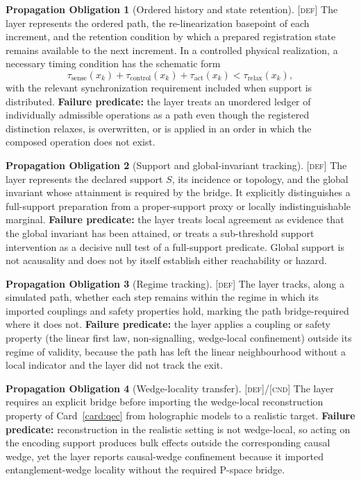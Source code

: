 \documentclass[11pt]{article}
\newcommand{\Defn}{\textsc{[def]}}
\newcommand{\Cnd}{\textsc{[cnd]}}
\theoremstyle{definition}
\newtheorem{sobligation}{Propagation Obligation}
\begin{document}
\begin{sobligation}[Ordered history and state retention]\label{ob:history}
\Defn{} The layer represents the ordered path, the re-linearization basepoint of
each increment, and the retention condition by which a prepared registration state
remains available to the next increment. In a controlled physical realization, a
necessary timing condition has the schematic form
\begin{equation}
\tau_{\mathrm{sense}}(x_k)+\tau_{\mathrm{control}}(x_k)+
\tau_{\mathrm{act}}(x_k)<\tau_{\mathrm{relax}}(x_k),
\label{eq:retention-cadence}
\end{equation}
with the relevant synchronization requirement included when support is distributed.
\textbf{Failure predicate:} the layer treats an unordered ledger of individually
admissible operations as a path even though the registered distinction relaxes,
is overwritten, or is applied in an order in which the composed operation does not
exist.
\end{sobligation}

\begin{sobligation}[Support and global-invariant tracking]\label{ob:support}
\Defn{} The layer represents the declared support $S$, its incidence or topology,
and the global invariant whose attainment is required by the bridge. It
explicitly distinguishes a full-support preparation from a proper-support proxy or
locally indistinguishable marginal. \textbf{Failure predicate:} the layer treats
local agreement as evidence that the global invariant has been attained, or treats
a sub-threshold support intervention as a decisive null test of a full-support
predicate. Global support is not acausality and does not by itself establish either
reachability or hazard.
\end{sobligation}

\begin{sobligation}[Regime tracking]\label{ob:regime}
\Defn{} The layer tracks, along a simulated path, whether each step remains within
the regime in which its imported couplings and safety properties hold, marking the
path bridge-required where it does not. \textbf{Failure predicate:} the layer
applies a coupling or safety property (the linear first law, non-signalling,
wedge-local confinement) outside its regime of validity, because the path has left
the linear neighbourhood without a local indicator and the layer did not track the
exit.
\end{sobligation}

\begin{sobligation}[Wedge-locality transfer]\label{ob:wedge}
\Defn{}/\Cnd{} The layer requires an explicit bridge before importing the
wedge-local reconstruction property of Card~\ref{card:qec} from holographic models
to a realistic target. \textbf{Failure predicate:} reconstruction in the realistic
setting is not wedge-local, so acting on the encoding support produces bulk effects
outside the corresponding causal wedge, yet the layer reports causal-wedge
confinement because it imported entanglement-wedge locality without the required
P-space bridge.
\end{sobligation}
\end{document}
